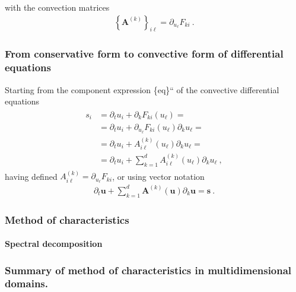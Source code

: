 \documentclass[letterpaper,10pt,english]{jupyterBook}
\begin{document}
\sphinxAtStartPar
with the convection matrices
\begin{equation*}
\begin{split}\left\{ \mathbf{A}^{(k)} \right\}_{i \ell} = \partial_{u_{\ell}} F_{ki} \ .\end{split}
\end{equation*}\subsubsection*{From conservative form to convective form of differential equations}

\sphinxAtStartPar
Starting from the component expression \{eq\}`` of the convective differential equations
\begin{equation*}
\begin{split}\begin{aligned}
  s_i
  & = \partial_t u_i + \partial_k F_{ki}(u_\ell) = \\
  & = \partial_t u_i + \partial_{u_{\ell}} F_{ki}(u_\ell) \partial_k u_\ell = \\
  & = \partial_t u_i + A_{i \ell}^{(k)}(u_\ell) \partial_k u_\ell = \\
  & = \partial_t u_i + \sum_{k=1}^{d} A_{i \ell}^{(k)}(u_\ell) \partial_k u_\ell \ ,
\end{aligned}\end{split}
\end{equation*}
\sphinxAtStartPar
having defined \(A_{i \ell}^{(k)} = \partial_{u_{\ell}} F_{ki}\), or using vector notation
\begin{equation*}
\begin{split}\partial_t \mathbf{u} + \sum_{k=1}^{d} \mathbf{A}^{(k)}(\mathbf{u}) \partial_k \mathbf{u} = \mathbf{s} \ .\end{split}
\end{equation*}

\subsubsection{Method of characteristics}
\label{\detokenize{ch/pde/hyperbolic-nd-draft:method-of-characteristics}}\label{\detokenize{ch/pde/hyperbolic-nd-draft:pde-hyperbolic-nd-draft-characteristics}}

\paragraph{Spectral decomposition}
\label{\detokenize{ch/pde/hyperbolic-nd-draft:spectral-decomposition}}\label{\detokenize{ch/pde/hyperbolic-nd-draft:pde-hyperbolic-nd-draft-characteristics-spectrum}}\subsubsection*{Summary of method of characteristics in multi\sphinxhyphen{}dimensional domains.}
\end{document}
